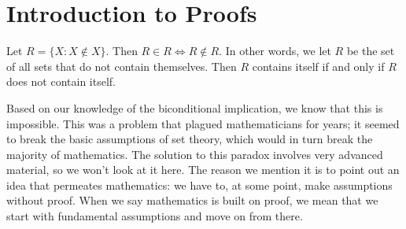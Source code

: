 \section{Introduction to Proofs}

\begin{namedtheorem}
    Let $R=\{X : X\notin X\}$. Then $R\in R\iff R\notin R$. In other words, we let $R$ be the set of all sets that do not contain themselves. Then $R$ contains itself if and only if $R$ does not contain itself.
\end{namedtheorem}
Based on our knowledge of the biconditional implication, we know that this is impossible. This was a problem that plagued mathematicians for years; it seemed to break the basic assumptions of set theory, which would in turn break the majority of mathematics. The solution to this paradox involves very advanced material, so we won't look at it here. The reason we mention it is to point out an idea that permeates mathematics: we have to, at some point, make assumptions without proof. When we say mathematics is built on proof, we mean that we start with fundamental assumptions and move on from there.

